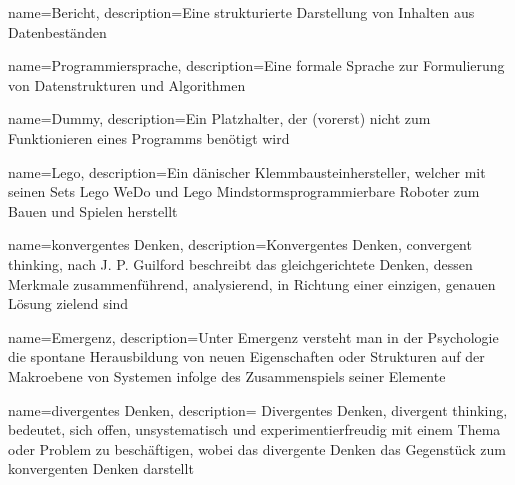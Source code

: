 
{
    name=Bericht,
    description={Eine strukturierte Darstellung von Inhalten aus Datenbeständen}
}

{
    name=Programmiersprache,
    description={Eine formale Sprache zur Formulierung von Datenstrukturen und Algorithmen}
}

{
    name=Dummy,
    description={Ein Platzhalter, der (vorerst) nicht zum Funktionieren eines Programms benötigt wird}
}

{
	name=Lego,
	description={Ein dänischer Klemmbausteinhersteller, welcher mit seinen Sets Lego WeDo und Lego Mindstorms\SymbReg programmierbare Roboter zum Bauen und Spielen herstellt}
}

{
	name={konvergentes Denken},
	description={Konvergentes Denken, convergent thinking, nach J. P. Guilford beschreibt das gleichgerichtete Denken, dessen Merkmale zusammenführend, analysierend, in Richtung einer einzigen, genauen Lösung zielend sind \cite{convergentThinking}}
}

{
	name=Emergenz,
	description={Unter Emergenz versteht man in der Psychologie die spontane Herausbildung von neuen Eigenschaften oder Strukturen auf der Makroebene von Systemen infolge des Zusammenspiels seiner Elemente \cite{emergentThinking}}
}

{
	name={divergentes Denken},
	description= {Divergentes Denken, divergent thinking, bedeutet, sich offen, unsystematisch und experimentierfreudig mit einem Thema oder Problem zu beschäftigen, wobei das divergente Denken  das Gegenstück zum konvergenten Denken darstellt \cite{divergentThinking}}
}

